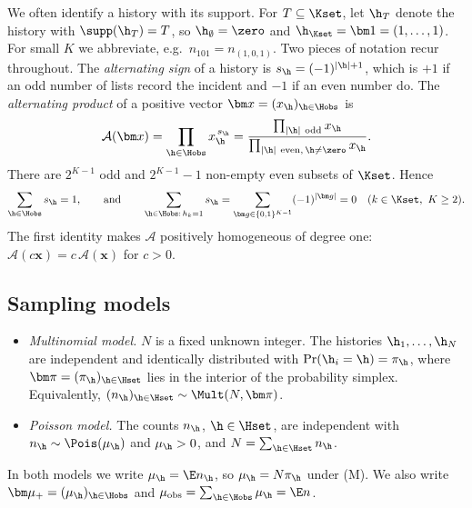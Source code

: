 We often identify a history with its support. For $T\subseteq\Kset$, let $\h_T$ denote the history with $\supp(\h_T)=T$, so $\h_\emptyset=\zero$ and $\h_{\Kset}=\bm 1=(1,\dots,1)$. For small $K$ we abbreviate, e.g.\ $n_{101}=n_{(1,0,1)}$. Two pieces of notation recur throughout. The \emph{alternating sign} of a history is $s_{\h}=(-1)^{|\h|+1}$, which is $+1$ if an odd number of lists record the incident and $-1$ if an even number do. The \emph{alternating product} of a positive vector $\bm x=(x_{\h})_{\h\in\Hobs}$ is
\begin{equation}\label{eq:fw-altprod}
  \mathcal A(\bm x)=\prod_{\h\in\Hobs}x_{\h}^{\,s_{\h}}
  =\frac{\prod_{|\h|\ \mathrm{odd}}x_{\h}}{\prod_{|\h|\ \mathrm{even},\,\h\neq\zero}x_{\h}} .
\end{equation}
There are $2^{K-1}$ odd and $2^{K-1}-1$ non-empty even subsets of $\Kset$. Hence
\begin{equation}\label{eq:fw-signsum}
  \sum_{\h\in\Hobs}s_{\h}=1,
  \qquad\text{and}\qquad
  \sum_{\h\in\Hobs:\,h_k=1}s_{\h}=\sum_{\bm g\in\{0,1\}^{K-1}}(-1)^{|\bm g|}=0\quad(k\in\Kset,\ K\ge2).
\end{equation}
The first identity makes $\mathcal A$ positively homogeneous of degree one: $\mathcal A(c\bm x)=c\,\mathcal A(\bm x)$ for $c>0$.

\subsection{Sampling models}\label{sec:fw-sampling}

\begin{definition}\label{def:fw-models}
\leavevmode
\begin{itemize}[leftmargin=2.4em]
  \item[(M)] \emph{Multinomial model.} $N$ is a fixed unknown integer. The histories $\h_1,\dots,\h_N$ are independent and identically distributed with $\Pr(\h_i=\h)=\pi_{\h}$, where $\bm\pi=(\pi_{\h})_{\h\in\Hset}$ lies in the interior of the probability simplex. Equivalently, $(n_{\h})_{\h\in\Hset}\sim\Mult(N,\bm\pi)$.
  \item[(P)] \emph{Poisson model.} The counts $n_{\h}$, $\h\in\Hset$, are independent with $n_{\h}\sim\Pois(\mu_{\h})$ and $\mu_{\h}>0$, and $N=\sum_{\h\in\Hset}n_{\h}$.
\end{itemize}
In both models we write $\mu_{\h}=\E n_{\h}$, so $\mu_{\h}=N\pi_{\h}$ under (M). We also write $\bm\mu_+=(\mu_{\h})_{\h\in\Hobs}$ and $\mu_{\mathrm{obs}}=\sum_{\h\in\Hobs}\mu_{\h}=\E n$.
\end{definition}

